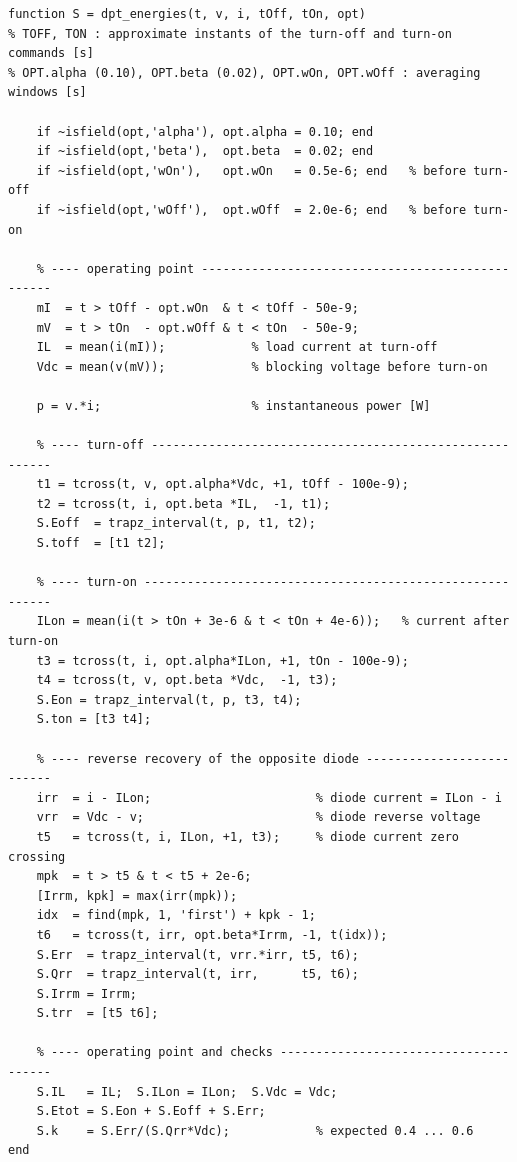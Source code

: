 \documentclass[11pt,a4paper]{article}
\begin{document}
\begin{lstlisting}[caption={Operating point and switching energies.}]
function S = dpt_energies(t, v, i, tOff, tOn, opt)
% TOFF, TON : approximate instants of the turn-off and turn-on commands [s]
% OPT.alpha (0.10), OPT.beta (0.02), OPT.wOn, OPT.wOff : averaging windows [s]

    if ~isfield(opt,'alpha'), opt.alpha = 0.10; end
    if ~isfield(opt,'beta'),  opt.beta  = 0.02; end
    if ~isfield(opt,'wOn'),   opt.wOn   = 0.5e-6; end   % before turn-off
    if ~isfield(opt,'wOff'),  opt.wOff  = 2.0e-6; end   % before turn-on

    % ---- operating point -------------------------------------------------
    mI  = t > tOff - opt.wOn  & t < tOff - 50e-9;
    mV  = t > tOn  - opt.wOff & t < tOn  - 50e-9;
    IL  = mean(i(mI));            % load current at turn-off
    Vdc = mean(v(mV));            % blocking voltage before turn-on

    p = v.*i;                     % instantaneous power [W]

    % ---- turn-off --------------------------------------------------------
    t1 = tcross(t, v, opt.alpha*Vdc, +1, tOff - 100e-9);
    t2 = tcross(t, i, opt.beta *IL,  -1, t1);
    S.Eoff  = trapz_interval(t, p, t1, t2);
    S.toff  = [t1 t2];

    % ---- turn-on ---------------------------------------------------------
    ILon = mean(i(t > tOn + 3e-6 & t < tOn + 4e-6));   % current after turn-on
    t3 = tcross(t, i, opt.alpha*ILon, +1, tOn - 100e-9);
    t4 = tcross(t, v, opt.beta *Vdc,  -1, t3);
    S.Eon = trapz_interval(t, p, t3, t4);
    S.ton = [t3 t4];

    % ---- reverse recovery of the opposite diode --------------------------
    irr  = i - ILon;                       % diode current = ILon - i
    vrr  = Vdc - v;                        % diode reverse voltage
    t5   = tcross(t, i, ILon, +1, t3);     % diode current zero crossing
    mpk  = t > t5 & t < t5 + 2e-6;
    [Irrm, kpk] = max(irr(mpk));
    idx  = find(mpk, 1, 'first') + kpk - 1;
    t6   = tcross(t, irr, opt.beta*Irrm, -1, t(idx));
    S.Err  = trapz_interval(t, vrr.*irr, t5, t6);
    S.Qrr  = trapz_interval(t, irr,      t5, t6);
    S.Irrm = Irrm;
    S.trr  = [t5 t6];

    % ---- operating point and checks --------------------------------------
    S.IL   = IL;  S.ILon = ILon;  S.Vdc = Vdc;
    S.Etot = S.Eon + S.Eoff + S.Err;
    S.k    = S.Err/(S.Qrr*Vdc);            % expected 0.4 ... 0.6
end
\end{lstlisting}
\end{document}
